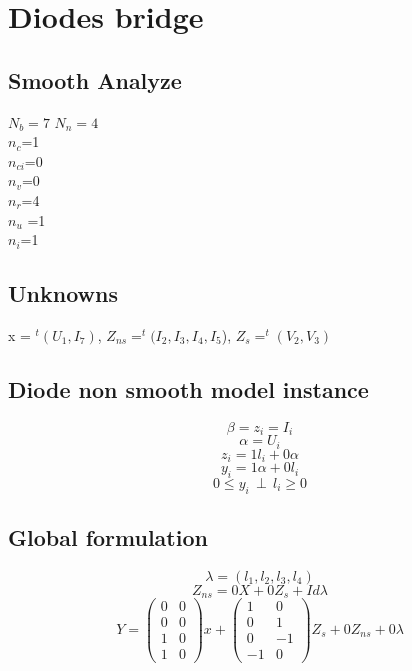 \documentclass[10pt]{article}
\begin{document}
\section{Diodes bridge}

\begin{figure}[h]
\centerline{
 \scalebox{0.7}{
    
 }
}\end{figure}

\subsection{Smooth Analyze}
$N_{b} = 7 $
$N_{n} = 4$\\
$n_{c}$=1\\
$n_{ci}$=0\\
$n_{v}$=0\\
$n_{r}$=4\\
$n_{u}$ =1\\
$n_{i}$=1\\




\subsection{Unknowns}

x = $^{t}(U_{1},I_{7})$,
$Z_{ns}=^{t}(I_{2},I_{3},I_{4},I_{5}$),
$Z_{s} = ^{t}(V_{2},V_{3})$
\subsection{Diode non smooth model instance}

\[ \beta = z_{i} = I_{i}\]
\[ \alpha =U_{i}\]
\[z_{i}=1l_{i}+0\alpha\]
\[y_{i}=1\alpha+0l_{i}\]
\[0 \leq y_{i} \, \perp \, l_{i} \geq 0\]


\subsection{Global formulation}

\[ \lambda =(l_{1},l_{2},l_{3},l_{4})\]
\[Z_{ns}=0X+0Z_{s}+Id\lambda\]
\[Y=\left(\begin{array}{cc}
0&0\\
0&0\\
1&0\\
1&0\end{array}\right) x+
\left(\begin{array}{cc}
1&0\\
0&1\\
0&-1\\
-1&0\end{array}
\right) Z_{s} + 0Z_{ns} +0\lambda\]
\end{document}
